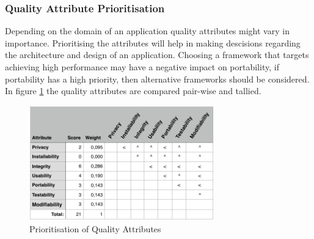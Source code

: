         \subsubsection{Quality Attribute Prioritisation}

            Depending on the domain of an application quality attributes might vary in importance. Prioritising the attributes will help in making descisions regarding the architecture and design of an application. Choosing a framework that targets achieving high performance may have a negative impact on portability, if portability has a high priority, then alternative frameworks should be considered. In figure \ref{fig:qa_prio} the quality attributes are compared pair-wise and tallied.

            \begin{figure}[H]
                \centering
                \includegraphics[width=8cm]{assets/requirements/QualityPrio.pdf}
                \caption{Prioritisation of Quality Attributes}
                \label{fig:qa_prio}
            \end{figure}



